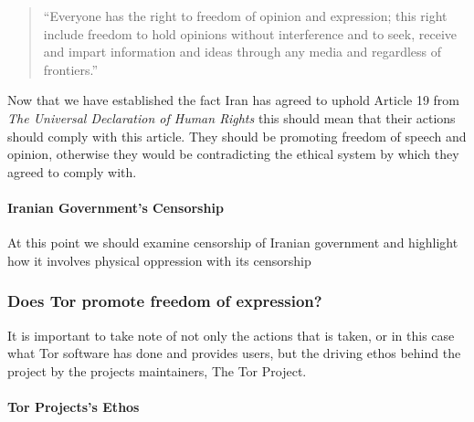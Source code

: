 \documentclass[11pt]{article}
\begin{document}
\begin{multicols}{2}
\begin{quotation} 
  ``Everyone has the right to freedom of opinion and expression;
  this right include freedom to hold opinions without interference and to seek,
  receive and impart information and ideas through any media and regardless of
  frontiers.''\cite{UniversalDeclerationOfHumanRights}
\end{quotation}

Now that we have established the fact Iran has agreed to uphold Article 19
from \textit{The Universal Declaration of Human Rights} this should mean that
their actions should comply with this article. They should be promoting freedom
of speech and opinion, otherwise they would be contradicting the ethical system
by which they agreed to comply with.

\paragraph{Iranian Government's Censorship}

At this point we should examine censorship of Iranian government and highlight
how it involves physical oppression with its censorship




\subsubsection{Does Tor promote freedom of expression?}

It is important to take note of not only the actions that is taken, or in this
case what Tor software has done and provides users, but the driving ethos behind
the project by the projects maintainers, The Tor Project.

\paragraph{Tor Projects's Ethos}


\end{multicols}
\end{document}
